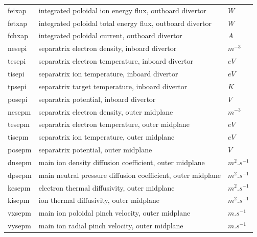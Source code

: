 \documentclass[a4paper,10pt]{report}
\begin{document}
\begin{center}
\begin{longtable}{|l|l|l|}
feixap \index{feixap}\index{b2time.nc, feixap} & integrated poloidal ion energy flux, outboard divertor & $W $ \\
fetxap \index{fetxap}\index{b2time.nc, fetxap} & integrated poloidal total energy flux, outboard divertor & $W $ \\
fchxap \index{fchxap}\index{b2time.nc, fchxap} & integrated poloidal current, outboard divertor & $A $ \\
nesepi \index{nesepi}\index{b2time.nc, nesepi} & separatrix electron density, inboard divertor & $m^{-3}$ \\
tesepi \index{tesepi}\index{b2time.nc, tesepi} & separatrix electron temperature, inboard divertor & $eV$ \\
tisepi \index{tisepi}\index{b2time.nc, tisepi} & separatrix ion temperature, inboard divertor & $eV$ \\
tpsepi \index{tpsepi}\index{b2time.nc, tpsepi} & separatrix target temperature, inboard divertor & $K $ \\
posepi \index{posepi}\index{b2time.nc, posepi} & separatrix potential, inboard divertor & $V $ \\
nesepm \index{nesepm}\index{b2time.nc, nesepm} & separatrix electron density, outer midplane & $m^{-3}$ \\
tesepm \index{tesepm}\index{b2time.nc, tesepm} & separatrix electron temperature, outer midplane & $eV$ \\
tisepm \index{tisepm}\index{b2time.nc, tisepm} & separatrix ion temperature, outer midplane & $eV$ \\
posepm \index{posepm}\index{b2time.nc, posepm} & separatrix potential, outer midplane & $V $ \\
dnsepm \index{dnsepm}\index{b2time.nc, dnsepm} & main ion density diffusion coefficient, outer midplane & $m^2.s^{-1}$ \\
dpsepm \index{dpsepm}\index{b2time.nc, dpsepm} & main neutral pressure diffusion coefficient, outer midplane & $m^2.s^{-1}$ \\
kesepm \index{kesepm}\index{b2time.nc, kesepm} & electron thermal diffusivity, outer midplane & $m^2.s^{-1}$ \\
kisepm \index{kisepm}\index{b2time.nc, kisepm} & ion thermal diffusivity, outer midplane & $m^2.s^{-1}$ \\
vxsepm \index{vxsepm}\index{b2time.nc, vxsepm} & main ion poloidal pinch velocity, outer midplane & $m.s^{-1}$ \\
vysepm \index{vysepm}\index{b2time.nc, vysepm} & main ion radial pinch velocity, outer midplane & $m.s^{-1}$ \\

\end{longtable}
\end{center}
\end{document}
